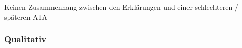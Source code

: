 
Keinen Zusammenhang zwischen den Erklärungen und einer schlechteren / späteren ATA

\subsubsection{Qualitativ}
\label{sec:study_results_qualitativ}
